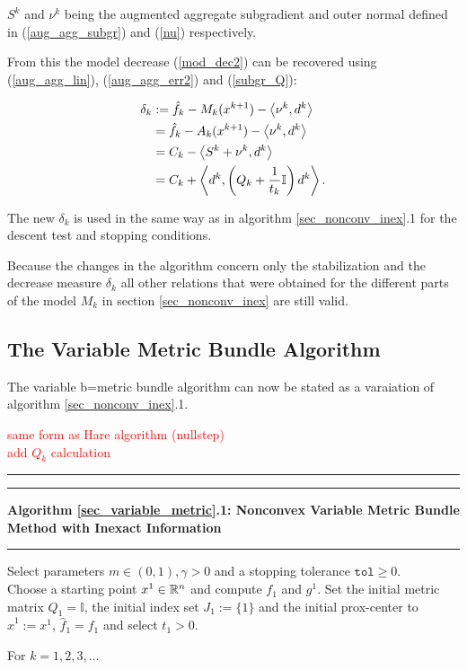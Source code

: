 \(S^k\) and \(\nu^k\) being the augmented aggregate subgradient and outer normal defined in (\ref{aug_agg_subgr}) and (\ref{nu}) respectively.

From this the model decrease (\ref{mod_dec2}) can be recovered using (\ref{aug_agg_lin}), (\ref{aug_agg_err2}) and (\ref{subgr_Q}):

\begin{equation}
\begin{split}
	\delta_k  &:= \hat{f}_k - M_k(x^{k+1}) - \left\langle\nu^k,d^k\right\rangle\\
	&= \hat{f}_k - A_k(x^{k+1}) - \left\langle\nu^k,d^k\right\rangle\\
	&= C_k - \left\langle S^k+\nu^k,d^k\right\rangle \\
	&= C_k + \left\langle d^k,\left(Q_k+\frac{1}{t_k}\mathbb{I}\right)d^k\right\rangle.
	\label{Noll_delta}
\end{split}
\end{equation}

The new \(\delta_k\) is used in the same way as in algorithm \ref{sec_nonconv_inex}.1 for the descent test and stopping conditions.

Because the changes in the algorithm concern only the stabilization and the decrease measure \(\delta_k\) all other relations that were obtained for the different parts of the model \(M_k\) in section \ref{sec_nonconv_inex} are still valid.

\subsection{The Variable Metric Bundle Algorithm}

The variable b=metric bundle algorithm can now be stated as a varaiation of algorithm \ref{sec_nonconv_inex}.1.

\textcolor{red}{same form as Hare algorithm (nullstep)\\
add \(Q_k\) calculation}

\begin{minipage}\linewidth
\vspace{1em}
\hrule  \vspace{0.4ex} \hrule
\vspace{1ex}
\textbf{Algorithm \ref{sec_variable_metric}.1: Nonconvex Variable Metric Bundle Method with Inexact Information}
\vspace{1ex}
\hrule
\vspace{1ex}
Select parameters \( m \in (0,1), \gamma > 0 \) and a stopping tolerance \( \mathtt{tol} \geq 0\). \\
Choose a starting point \(x^1 \in \mathbb{R}^n\) and compute \(f_1\) and \(g^1\). Set the initial metric matrix \(Q_1 = \mathbb{I}\), the initial index set \(J_1:=\{1\}\) and the initial prox-center to \(\hat{x}^1 := x^1\), \(\hat{f}_1 = f_1\) and select \(t_1 > 0\).
\end{minipage}
For \(k = 1,2,3,  \dotsc \)   

